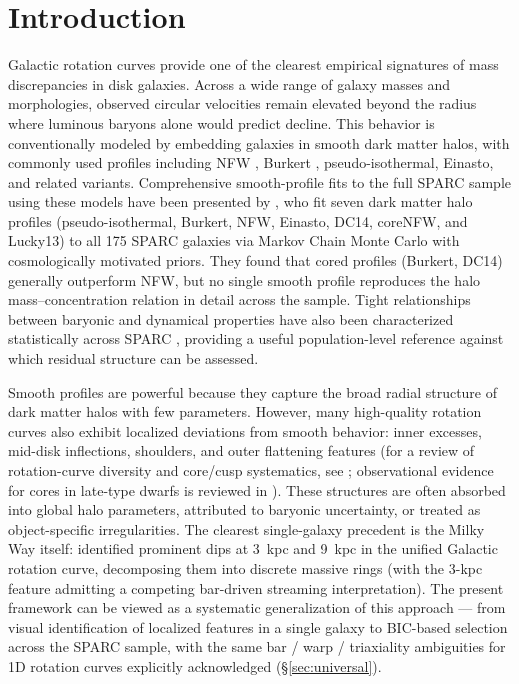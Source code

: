\documentclass[linenumbers]{aastex701}
\begin{document}


\section{Introduction}\label{sec:intro}

Galactic rotation curves provide one of the clearest empirical signatures of mass discrepancies in disk galaxies. Across a wide range of galaxy masses and morphologies, observed circular velocities remain elevated beyond the radius where luminous baryons alone would predict decline. This behavior is conventionally modeled by embedding galaxies in smooth dark matter halos, with commonly used profiles including NFW \citep{NFW1996,NFW1997}, Burkert \citep{Burkert1995}, pseudo-isothermal, Einasto, and related variants. Comprehensive smooth-profile fits to the full SPARC sample using these models have been presented by \citet{Li2020}, who fit seven dark matter halo profiles (pseudo-isothermal, Burkert, NFW, Einasto, DC14, coreNFW, and Lucky13) to all 175 SPARC galaxies via Markov Chain Monte Carlo with cosmologically motivated priors. They found that cored profiles (Burkert, DC14) generally outperform NFW, but no single smooth profile reproduces the halo mass--concentration relation in detail across the sample. Tight relationships between baryonic and dynamical properties have also been characterized statistically across SPARC \citep{Lelli2016,McGaugh2016}, providing a useful population-level reference against which residual structure can be assessed.

Smooth profiles are powerful because they capture the broad radial structure of dark matter halos with few parameters. However, many high-quality rotation curves also exhibit localized deviations from smooth behavior: inner excesses, mid-disk inflections, shoulders, and outer flattening features (for a review of rotation-curve diversity and core/cusp systematics, see \citealt{deBlok2010}; observational evidence for cores in late-type dwarfs is reviewed in \citealt{Oh2015}). These structures are often absorbed into global halo parameters, attributed to baryonic uncertainty, or treated as object-specific irregularities. The clearest single-galaxy precedent is the Milky Way itself: \citet{Sofue2009} identified prominent dips at 3~kpc and 9~kpc in the unified Galactic rotation curve, decomposing them into discrete massive rings (with the 3-kpc feature admitting a competing bar-driven streaming interpretation). The present framework can be viewed as a systematic generalization of this approach --- from visual identification of localized features in a single galaxy to BIC-based selection across the SPARC sample, with the same bar / warp / triaxiality ambiguities for 1D rotation curves explicitly acknowledged (\S\ref{sec:universal}).
\end{document}
